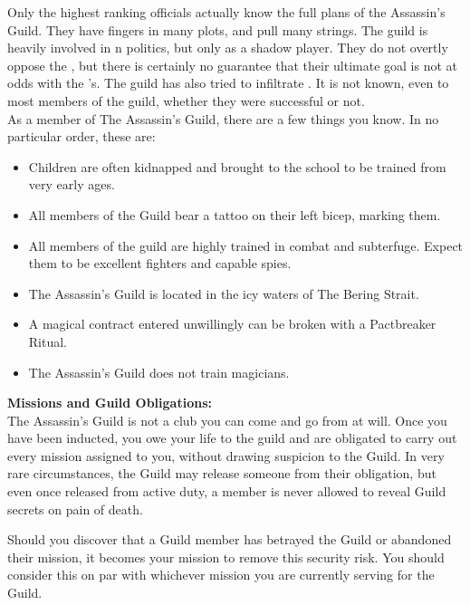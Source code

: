 \documentclass[blue]{NeptuneBall}
\begin{document}
\name{\bAssassin{}}

Only the highest ranking officials actually know the full plans of the Assassin's Guild. They have fingers in many plots, and pull many strings. The guild is heavily involved in \pPacifica{}n politics, but only as a shadow player.  They do not overtly oppose the \cPacificanRuler{\King}, but there is certainly no guarantee that their ultimate goal is not at odds with the \cPacificanRuler{\King}'s. The guild has also tried to infiltrate \pAtlantis{}. It is not known, even to most members of the guild, whether they were successful or not.\\

As a member of The Assassin's Guild, there are a few things you know. In no particular order, these are:

\begin{itemize}
  \item Children are often kidnapped and brought to the school to be trained from very early ages.
  \item All members of the Guild bear a tattoo on their left bicep, marking them.
  \item All members of the guild are highly trained in combat and subterfuge. Expect them to be excellent fighters and capable spies.
  \item The Assassin's Guild is located in the icy waters of The Bering Strait.
	\item A magical contract entered unwillingly can be broken with a Pactbreaker Ritual.
  \item The Assassin's Guild does not train magicians.\\
\end{itemize}

{\bf Missions and Guild Obligations:}\\
The Assassin's Guild is not a club you can come and go from at will. Once you have been inducted, you owe your life to the guild and are obligated to carry out every mission assigned to you, without drawing suspicion to the Guild. In very rare circumstances, the Guild may release someone from their obligation, but even once released from active duty, a member is never allowed to reveal Guild secrets on pain of death.

Should you discover that a Guild member has betrayed the Guild or abandoned their mission, it becomes your mission to remove this security risk. You should consider this on par with whichever mission you are currently serving for the Guild.
\end{document}
